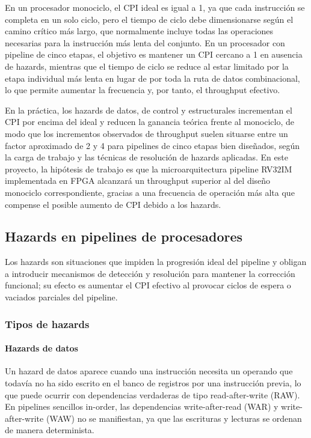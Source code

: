 En un procesador monociclo, el CPI ideal es igual a 1, ya que cada instrucción se completa en un solo ciclo, pero el tiempo de ciclo debe dimensionarse según el camino crítico más largo, que normalmente incluye todas las operaciones necesarias para la instrucción más lenta del conjunto. En un procesador con pipeline de cinco etapas, el objetivo es mantener un CPI cercano a 1 en ausencia de hazards, mientras que el tiempo de ciclo se reduce al estar limitado por la etapa individual más lenta en lugar de por toda la ruta de datos combinacional, lo que permite aumentar la frecuencia y, por tanto, el throughput efectivo.

En la práctica, los hazards de datos, de control y estructurales incrementan el CPI por encima del ideal y reducen la ganancia teórica frente al monociclo, de modo que los incrementos observados de throughput suelen situarse entre un factor aproximado de 2 y 4 para pipelines de cinco etapas bien diseñados, según la carga de trabajo y las técnicas de resolución de hazards aplicadas. En este proyecto, la hipótesis de trabajo es que la microarquitectura pipeline RV32IM implementada en FPGA alcanzará un throughput superior al del diseño monociclo correspondiente, gracias a una frecuencia de operación más alta que compense el posible aumento de CPI debido a los hazards.


\subsection{Hazards en pipelines de procesadores}

Los hazards son situaciones que impiden la progresión ideal del pipeline y obligan a introducir mecanismos de detección y resolución para mantener la corrección funcional; su efecto es aumentar el CPI efectivo al provocar ciclos de espera o vaciados parciales del pipeline.\parencite{Patterson2017Computer,Harris2021Digital}


\subsubsection{Tipos de hazards}

\paragraph{Hazards de datos}

Un hazard de datos aparece cuando una instrucción necesita un operando que todavía no ha sido escrito en el banco de registros por una instrucción previa, lo que puede ocurrir con dependencias verdaderas de tipo read-after-write (RAW). En pipelines sencillos in-order, las dependencias write-after-read (WAR) y write-after-write (WAW) no se manifiestan, ya que las escrituras y lecturas se ordenan de manera determinista.\parencite{Patterson2017Computer}

